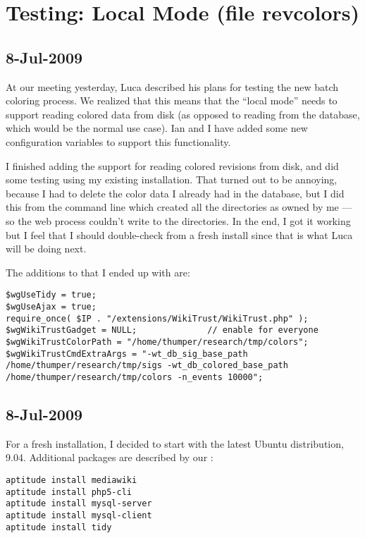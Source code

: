 \section{Testing: Local Mode (file revcolors)}

\subsection{8-Jul-2009}

At our meeting yesterday, Luca described his plans for testing
the new batch coloring process.
We realized that this means that the ``local mode'' needs
to support reading colored data from disk (as opposed to
reading from the database, which would be the normal use case).
Ian and I have added some new configuration variables to
support this functionality.

I finished adding the support for reading colored revisions from
disk, and did some testing using my existing installation.
That turned out to be annoying, because I had to delete the
color data I already had in the database, but I did this from
the command line which created all the directories as owned by
me --- so the web process couldn't write to the directories.
In the end, I got it working but I feel that I should double-check
from a fresh install since that is what Luca will be doing next.

The additions to  that I ended up with
are:
\begin{verbatim}
$wgUseTidy = true;
$wgUseAjax = true;
require_once( $IP . "/extensions/WikiTrust/WikiTrust.php" );
$wgWikiTrustGadget = NULL;              // enable for everyone
$wgWikiTrustColorPath = "/home/thumper/research/tmp/colors";
$wgWikiTrustCmdExtraArgs = "-wt_db_sig_base_path /home/thumper/research/tmp/sigs -wt_db_colored_base_path /home/thumper/research/tmp/colors -n_events 10000";
\end{verbatim}

\subsection{8-Jul-2009}

For a fresh installation, I decided to start with the latest
Ubuntu distribution, 9.04.
Additional packages are described by our :
\begin{verbatim}
aptitude install mediawiki
aptitude install php5-cli
aptitude install mysql-server
aptitude install mysql-client
aptitude install tidy
\end{verbatim}

